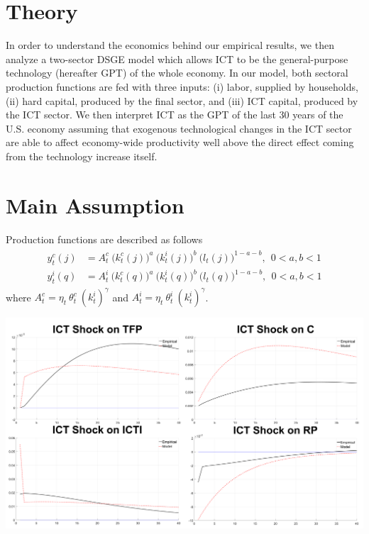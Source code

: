 \documentclass[a0,landscape]{a0poster}
\begin{document}
\begin{multicols}{4}
\section*{Theory}

In order to understand the economics behind our empirical results, we then analyze a two-sector DSGE model which allows ICT to be the general-purpose technology (hereafter GPT) of the whole economy. In our model, both sectoral production functions are fed with three inputs: (i) labor, supplied by households, (ii) hard capital, produced by the final sector, and (iii) ICT capital, produced by the ICT sector. We then interpret ICT as the GPT of the last 30 years of the U.S. economy assuming that exogenous technological changes in the ICT sector are able to affect economy-wide productivity well above the direct effect coming from the technology increase itself.

\section*{Main Assumption}

Production functions are described as follows
\begin{eqnarray*}
\begin{aligned}
y^c_t(j) &= A^c_t \ \big( k^c_{t}(j) \big)^a \ \big( k^i_{t}(j) \big)^b \ \big( l_{t}(j) \big)^{1-a-b}, \ \ 0 < a,b < 1 \\
y^i_t(q) &= A_t^i \ \big( k^c_{t}(q) \big)^a \ \big( k^i_{t}(q) \big)^b \ \big( l_{t}(q) \big)^{1-a-b}, \ \ 0 < a,b < 1
\end{aligned}
\end{eqnarray*}
where $A_t^c = \eta_t \ \theta^c_t \ (k^i_{t})^{\gamma}$ and $A_t^i = \eta_t \ \theta^i_t \ (k^i_{t})^{\gamma}$.

\begin{center}\vspace{1cm}
	\includegraphics[width=1\linewidth]{IRmatchingall}
\end{center}\vspace{1cm}


\end{multicols}
\end{document}

